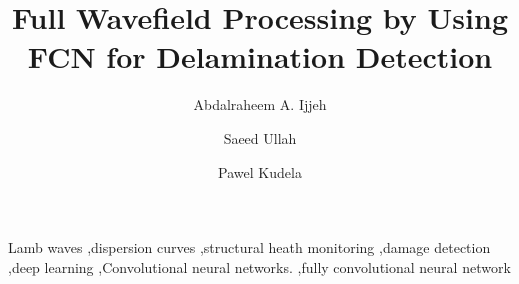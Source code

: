 \documentclass[preprint,9pt]{elsarticle}
\begin{document}
	\begin{frontmatter}
		
		\title{Full Wavefield Processing by Using FCN for Delamination Detection}
		
		\address[IFFM]{Institute of Fluid Flow Machinery, Polish Academy of Sciences, Poland}
		
		\author{Abdalraheem A. Ijjeh}
		\author{Saeed Ullah }
		\author{Pawel Kudela}
		
		
		\begin{abstract}
		
		\end{abstract}
		
		\begin{keyword}
			Lamb waves \sep dispersion curves \sep structural heath monitoring \sep damage detection \sep deep learning \sep Convolutional neural networks. \sep fully convolutional neural network
			
			
		\end{keyword}
		
	\end{frontmatter}
\end{document}
